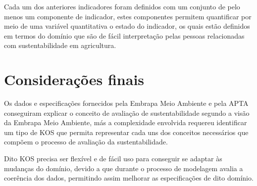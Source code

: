 Cada um dos anteriores indicadores foram definidos com um conjunto
de pelo menos um componente de indicador, estes componentes permitem
quantificar por meio de uma variável quantitativa o estado do indicador,
os quais estão definidos em termos do domínio que são de fácil interpretação
pelas pessoas relacionadas com sustentabilidade em agricultura.

\section{Considerações finais}

Os dados e especificações fornecidos pela Embrapa Meio Ambiente e
pela APTA conseguiram explicar o conceito de avaliação de sustentabilidade
segundo a visão da Embrapa Meio Ambiente, más a complexidade envolvida
requereu identificar um tipo de KOS que permita representar cada uns
dos conceitos necessários que compõem o processo de avaliação da sustentabilidade.

Dito KOS precisa ser flexível e de fácil uso para conseguir se adaptar
às mudanças do domínio, devido a que durante o processo de modelagem
avalia a coerência dos dados, permitindo assim melhorar as especificações
de dito domínio.
